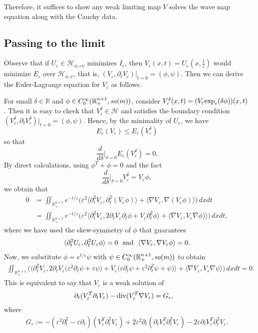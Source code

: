\documentclass[12pt,twoside,reqno]{amsart}
\theoremstyle{definition}              %
\theoremstyle{remark}                  %
\newcommand{\R}{\mathbb{R}}                 %
\newcommand{\eps}{\varepsilon}
\renewcommand{\exp}{\textup{exp}}
\renewcommand{\1}{\mathbbm{1}}                                      %
\numberwithin{equation}{section}
\numberwithin{definition}{section}
\numberwithin{theorem}{section}
\numberwithin{remark}{section}
\begin{document}
Therefore, it suffices to show any weak limiting map $V$
solves the wave map equation along with the Cauchy data. 

\subsection{Passing to the limit} 
Observe that if $U_\eps\in\mathcal{H}_{\phi, \eps\psi}$ 
minimizes $I_\eps$, then $V_\eps(x,t)=U_\eps(x, \frac{t}{\eps})$
would minimize $E_\eps$ over $\mathcal{H}_{\phi,\psi}$,
that is, $(V_\eps, \partial_t V_\eps)\big|_{t=0}=(\phi,\psi)$. Then we can derive the Euler-Lagrange equation 
for $V_\eps$ as follows.

For small $\delta\in \R$ and $\phi\in C^\infty_0(\R^{n+1}_+, {\it so}(m))$, consider
$V_\eps^\delta(x,t)=(V_\eps\exp_e(\delta\phi))(x,t)$.
Then it is easy to check that $V_\eps^\delta\in\mathcal{H}$
and satisfies the boundary condition $(V_\eps^\delta, \partial_t V_\eps^\delta)\big|_{t=0}=(\phi,\psi)$.
Hence, by the minimality of $U_\eps$, we have 
\[
E_\eps(V_\eps)\le E_\eps(V_\eps^\delta)
\]
so that
\[
\frac{d}{d\delta}\big|_{\delta=0}E_\eps(V_\eps^\delta)=0.
\]
By direct calculations, using $\phi^T+\phi=0$ and the fact
\[
\frac{d}{d\delta}\big|_{\delta=0}V_\eps^\delta=V_\eps\phi,
\]
we obtain that
\begin{align*}
0&=\iint_{\R^{n+1}_+}e^{-t/\eps}\Big(\eps^2\langle \partial_t^2V_\eps, \partial_t^2(V_\eps\phi)\rangle 
+\langle\nabla V_\eps, \nabla(V_\eps\phi)\rangle\Big)\,dxdt\\
&=\iint_{\R^{n+1}_+}e^{-t/\eps}\Big(\eps^2\langle \partial_t^2 V_\eps, 2\partial_tV_\eps\partial_t\phi+V_\eps
\partial_t^2\phi\rangle +\langle\nabla V_\eps, V_\eps\nabla \phi)\rangle\Big)\,dxdt,
\end{align*}
where we have used the skew-symmetry of $\phi$ that guarantees
\[
\langle \partial_t^2 U_\eps, \partial_t^2U_\eps\phi\rangle=0\
\ {\rm{and}}\ \ \langle\nabla V_\eps, \nabla V_\eps\phi\rangle =0.
\]
Now, we substitute $\phi=e^{t/\eps}\psi$ with 
$\psi\in C^\infty_0(\R^{n+1}_+, {\it so}(m))$ to obtain
\begin{align*}
\iint_{\R^{n+1}_+}\Big(\big\langle \partial_t^2V_\eps, 2\partial_tV_\eps\big(\eps^2\partial_t\psi+{\eps}\psi\big)+V_\eps\big({\eps}\partial_t\psi+\eps^2\partial_t^2\psi  +\psi\big)\big\rangle +\big\langle\nabla V_\eps, V_\eps\nabla \psi\big\rangle\Big)\,dxdt=0. 
\end{align*}
This is equivalent to say that $V_\eps$ is a weak solution of
\begin{align}\label{eps-wave1}
&\partial_t(V_\eps^T\partial_tV_\eps) -{\rm{div}}(V_\eps^T\nabla V_\eps)=G_\epsilon,
\end{align}
where
\begin{align}\label{eps-wave2}
G_\eps:=-(\eps^2\partial_t^2-\eps\partial_t)(V_\eps^T\partial_t^2V_\eps)
+2\eps^2\partial_t(\partial_t V_\eps^T\partial_t^2V_\eps)
-2\eps\partial_tV_\eps^T\partial_t^2V_\eps.
\end{align}
\end{document}
